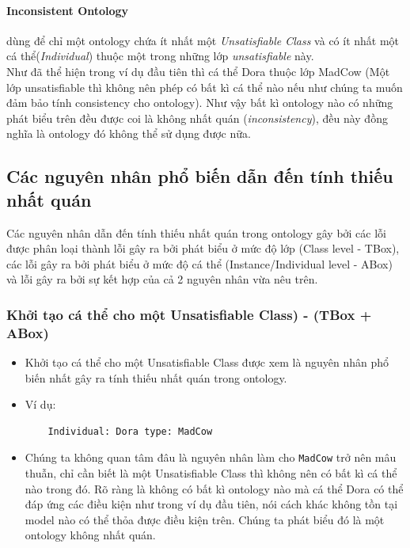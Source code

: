 \paragraph{Inconsistent Ontology} dùng để chỉ một ontology chứa ít nhất một \textit{Unsatisfiable Class} và có ít nhất một cá thể(\textit{Individual}) thuộc một trong những lớp \textit{unsatisfiable} này.
\\
\hspace{0.05\textwidth} Như đã thể hiện trong ví dụ đầu tiên thì cá thể Dora thuộc lớp MadCow (Một lớp unsatisfiable thì không nên phép có bất kì cá thể nào nếu như chúng ta muốn đảm bảo tính consistency cho ontology). Như vậy bất kì ontology nào có những phát biểu trên đều được coi là không nhất quán (\textit{inconsistency}), đều này đồng nghĩa là ontology đó không thể sử dụng được nữa.

\subsection{Các nguyên nhân phổ biến dẫn đến tính thiếu nhất quán}
Các nguyên nhân dẫn đến tính thiếu nhất quán trong ontology gây bởi các lỗi được phân loại thành lỗi gây ra bởi phát biểu ở mức độ lớp (Class level - TBox), các lỗi gây ra bởi phát biểu ở mức độ cá thể (Instance/Individual level - ABox)\cite{inconsitentReason} và lỗi gây ra bởi sự kết hợp của cả 2 nguyên nhân vừa nêu trên.
\subsubsection{Khởi tạo cá thể cho một Unsatisfiable Class) - (TBox + ABox)}
\begin{itemize}
	\item
	Khởi tạo cá thể cho một Unsatisfiable Class được xem là nguyên nhân phổ biến nhất gây ra tính thiếu nhất quán trong ontology.
	\item
	Ví dụ:
	\begin{verbatim}
	Individual: Dora type: MadCow
	\end{verbatim}
	\item
	Chúng ta không quan tâm đâu là nguyên nhân làm cho \texttt{MadCow} trở nên mâu thuẫn, chỉ cần biết là một Unsatisfiable Class thì không nên có bất kì cá thể nào trong đó. Rõ ràng là không có bất kì ontology nào mà cá thể Dora có thể đáp ứng các điều kiện như trong ví dụ đầu tiên, nói cách khác không tồn tại model nào có thể thỏa được điều kiện trên. Chúng ta phát biểu đó là một ontology không nhất quán.
\end{itemize}
